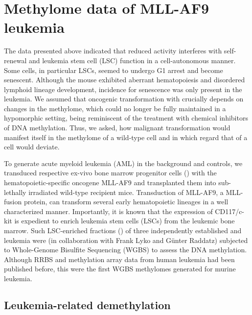 \chapter{Methylome data of MLL-AF9 leukemia}\setlength{\fboxsep}{3pt}
\minitoc

The data presented above  indicated that reduced  activity interferes with self-renewal and leukemia stem cell (LSC) function in a cell-autonomous manner. Some cells, in particular LSCs, seemed to undergo G1 arrest and become senescent. Although the \dnmtchip mouse exhibited aberrant hematopoiesis and disordered lymphoid lineage development\cite{Broeske2009}, incidence for senescence was only present in the leukemia. We assumed that oncogenic transformation with \mllafnine crucially depends on changes in the methylome, which could no longer be fully maintained in a  hypomorphic setting, being reminiscent of the treatment with chemical inhibitors of DNA methylation\cite{Stresemann2006,Hollenbach2010}. Thus, we asked, how malignant transformation would manifest itself in the methylome of a wild-type cell and in which regard that of a \dnmtchip cell would deviate.

To generate acute myeloid leukemia (AML) in the \dnmtchip background and \dnmtwt controls, we transduced respective ex-vivo bone marrow progenitor cells (\lsk) with the hematopoietic-specific oncogene MLL-AF9 and transplanted them into sub-lethally irradiated wild-type recipient mice. Transduction of MLL-AF9, a MLL-fusion protein, can transform several early hematopoietic lineages\cite{George2016} in a well characterized manner\cite{Somervaille2009,Krivtsov2013,Stavropoulou2016}. Importantly, it is known that the expression of CD117/c-kit is expedient to enrich leukemia stem cells (LSCs) from the leukemic bone marrow\cite{Krivtsov2006,Somervaille2006}. Such LSC-enriched \kitpos fractions (\lgmp) of three independently established \mllafnine \dnmtwt and \dnmtchip leukemia were (in collaboration with Frank Lyko and Günter Raddatz) subjected to Whole-Genome Bisulfite Sequencing (WGBS) to assess the DNA methylation. Although RRBS and methylation array data from human leukemia had been published before\cite{Akalin2012a,TCGAC2013}, this were the first WGBS methylomes generated for murine \mllafnine leukemia. 

\section{Leukemia-related demethylation}
\label{chap:r:wgbs:demethylation}

